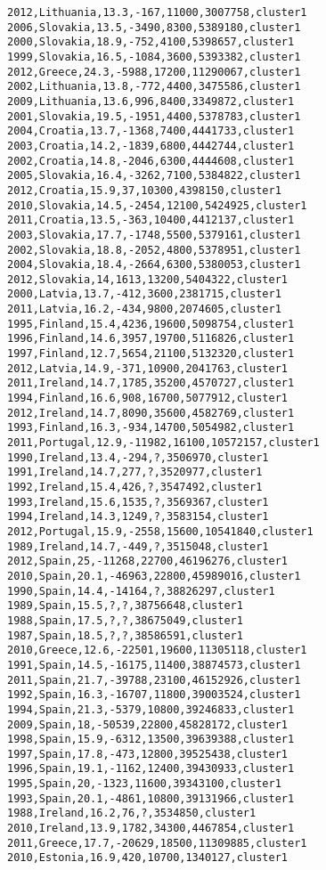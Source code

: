 \begin{lstlisting}[basicstyle=\footnotesize\ttfamily,numbers=none]
2012,Lithuania,13.3,-167,11000,3007758,cluster1
2006,Slovakia,13.5,-3490,8300,5389180,cluster1
2000,Slovakia,18.9,-752,4100,5398657,cluster1
1999,Slovakia,16.5,-1084,3600,5393382,cluster1
2012,Greece,24.3,-5988,17200,11290067,cluster1
2002,Lithuania,13.8,-772,4400,3475586,cluster1
2009,Lithuania,13.6,996,8400,3349872,cluster1
2001,Slovakia,19.5,-1951,4400,5378783,cluster1
2004,Croatia,13.7,-1368,7400,4441733,cluster1
2003,Croatia,14.2,-1839,6800,4442744,cluster1
2002,Croatia,14.8,-2046,6300,4444608,cluster1
2005,Slovakia,16.4,-3262,7100,5384822,cluster1
2012,Croatia,15.9,37,10300,4398150,cluster1
2010,Slovakia,14.5,-2454,12100,5424925,cluster1
2011,Croatia,13.5,-363,10400,4412137,cluster1
2003,Slovakia,17.7,-1748,5500,5379161,cluster1
2002,Slovakia,18.8,-2052,4800,5378951,cluster1
2004,Slovakia,18.4,-2664,6300,5380053,cluster1
2012,Slovakia,14,1613,13200,5404322,cluster1
2000,Latvia,13.7,-412,3600,2381715,cluster1
2011,Latvia,16.2,-434,9800,2074605,cluster1
1995,Finland,15.4,4236,19600,5098754,cluster1
1996,Finland,14.6,3957,19700,5116826,cluster1
1997,Finland,12.7,5654,21100,5132320,cluster1
2012,Latvia,14.9,-371,10900,2041763,cluster1
2011,Ireland,14.7,1785,35200,4570727,cluster1
1994,Finland,16.6,908,16700,5077912,cluster1
2012,Ireland,14.7,8090,35600,4582769,cluster1
1993,Finland,16.3,-934,14700,5054982,cluster1
2011,Portugal,12.9,-11982,16100,10572157,cluster1
1990,Ireland,13.4,-294,?,3506970,cluster1
1991,Ireland,14.7,277,?,3520977,cluster1
1992,Ireland,15.4,426,?,3547492,cluster1
1993,Ireland,15.6,1535,?,3569367,cluster1
1994,Ireland,14.3,1249,?,3583154,cluster1
2012,Portugal,15.9,-2558,15600,10541840,cluster1
1989,Ireland,14.7,-449,?,3515048,cluster1
2012,Spain,25,-11268,22700,46196276,cluster1
2010,Spain,20.1,-46963,22800,45989016,cluster1
1990,Spain,14.4,-14164,?,38826297,cluster1
1989,Spain,15.5,?,?,38756648,cluster1
1988,Spain,17.5,?,?,38675049,cluster1
1987,Spain,18.5,?,?,38586591,cluster1
2010,Greece,12.6,-22501,19600,11305118,cluster1
1991,Spain,14.5,-16175,11400,38874573,cluster1
2011,Spain,21.7,-39788,23100,46152926,cluster1
1992,Spain,16.3,-16707,11800,39003524,cluster1
1994,Spain,21.3,-5379,10800,39246833,cluster1
2009,Spain,18,-50539,22800,45828172,cluster1
1998,Spain,15.9,-6312,13500,39639388,cluster1
1997,Spain,17.8,-473,12800,39525438,cluster1
1996,Spain,19.1,-1162,12400,39430933,cluster1
1995,Spain,20,-1323,11600,39343100,cluster1
1993,Spain,20.1,-4861,10800,39131966,cluster1
1988,Ireland,16.2,76,?,3534850,cluster1
2010,Ireland,13.9,1782,34300,4467854,cluster1
2011,Greece,17.7,-20629,18500,11309885,cluster1
2010,Estonia,16.9,420,10700,1340127,cluster1

\end{lstlisting}
